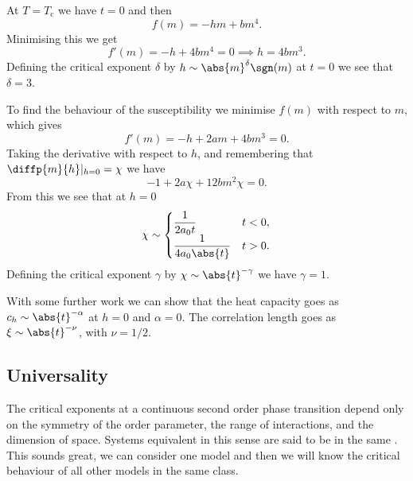 \documentclass[fleqn]{NotesClass}
\begin{document}
    At \(T = T_{\mathrm{c}}\) we have \(t = 0\) and then
    \begin{equation}
        f(m) = -hm + bm^4.
    \end{equation}
    Minimising this we get
    \begin{equation}
        f'(m) = -h + 4bm^4 = 0 \implies h = 4bm^3.
    \end{equation}
    Defining the critical exponent \(\delta\) by \(h \sim \abs{m}^{\delta}\sgn(m)\) at \(t = 0\) we see that \(\delta = 3\).
    
    To find the behaviour of the susceptibility we minimise \(f(m)\) with respect to \(m\), which gives
    \begin{equation}
        f'(m) = -h + 2am + 4bm^3 = 0.
    \end{equation}
    Taking the derivative with respect to \(h\), and remembering that \(\diffp{m}{h}|_{h = 0} = \chi\) we have
    \begin{equation}
        -1 + 2a\chi + 12bm^2\chi = 0.
    \end{equation}
    From this we see that at \(h = 0\)
    \begin{equation}
        \chi \sim 
        \begin{cases}
            \dfrac{1}{2a_0t} & t < 0,\\
            \dfrac{1}{4a_0\abs{t}} & t > 0.
        \end{cases}
    \end{equation}
    Defining the critical exponent \(\gamma\) by \(\chi \sim \abs{t}^{-\gamma}\) we have \(\gamma = 1\).
    
    With some further work we can show that the heat capacity goes as \(c_h \sim \abs{t}^{-\alpha}\) at \(h = 0\) and \(\alpha = 0\).
    The correlation length goes as \(\xi \sim \abs{t}^{-\nu}\), with \(\nu = 1/2\).
    
    \subsection{Universality}
    The critical exponents at a continuous second order phase transition depend only on the symmetry of the order parameter, the range of interactions, and the dimension of space.
    Systems equivalent in this sense are said to be in the same .
    This sounds great, we can consider one model and then we will know the critical behaviour of all other models in the same class.
    
\end{document}
